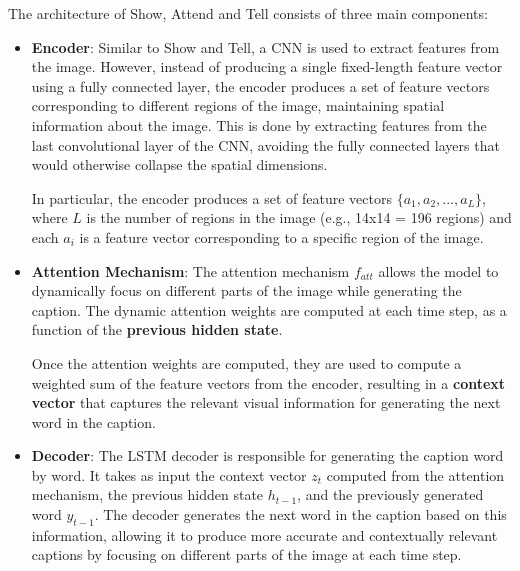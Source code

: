 The architecture of Show, Attend and Tell consists of three main components:
\begin{itemize}
    \item \textbf{Encoder}: Similar to Show and Tell, a CNN is used to extract features from the image. 
    However, instead of producing a single fixed-length feature vector using a fully connected layer, 
    the encoder produces a set of feature vectors corresponding to different regions of the image, maintaining spatial information about the image. 
    This is done by extracting features from the last convolutional layer of the CNN,
    avoiding the fully connected layers that would otherwise collapse the spatial dimensions.
    
    In particular, the encoder produces a set of feature vectors $\{a_1, a_2, ..., a_L\}$, where $L$ is the number of regions in the image (e.g., 14x14 = 196 regions) 
    and each $a_i$ is a feature vector corresponding to a specific region of the image.
    
    \item \textbf{Attention Mechanism}: The attention mechanism $f_{att}$ allows the model to dynamically focus on different parts of the image while generating the caption.
    The dynamic attention weights are computed at each time step, as a function of the \textbf{previous hidden state}.
    
    Once the attention weights are computed, they are used to compute a weighted sum of the feature vectors from the encoder,
    resulting in a \textbf{context vector} that captures the relevant visual information for generating the next word in the caption.
    
    \item \textbf{Decoder}: The LSTM decoder is responsible for generating the caption word by word. It takes as input the context vector $z_t$ computed
    from the attention mechanism, the previous hidden state $h_{t-1}$, and the previously generated word $y_{t-1}$.
    The decoder generates the next word in the caption based on this information, allowing it to produce more accurate and contextually relevant captions by focusing on different parts of the image at each time step.
\end{itemize}

